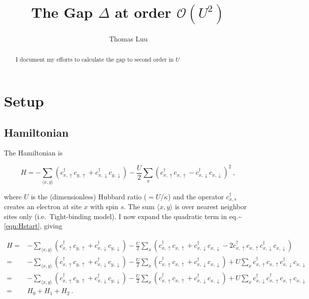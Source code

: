 \documentclass[
  letterpaper,
  DIV=11,
  numbers=noendperiod]{scrartcl}
\title{The Gap \(\Delta\) at order \(\mathcal{O}(U^2)\)}
\author{Thomas Luu}
\date{}
\begin{document}
\maketitle
\begin{abstract}
I document my efforts to calculate the gap to second order in \(U\)
\end{abstract}


\section{Setup}\label{setup}

\subsection{Hamiltonian}\label{hamiltonian}

The Hamiltonian is

\begin{equation}\label{eqn:Hstart}
H = -\sum_{\langle x,y\rangle}\left(c^\dagger_{x,\uparrow}c^{}_{y,\uparrow}+c^\dagger_{x,\downarrow}c^{}_{y,\downarrow}\right)-\frac{U}{2}\sum_x\left(c^\dagger_{x,\uparrow}c^{}_{x,\uparrow}-c^\dagger_{x,\downarrow}c^{}_{x,\downarrow}\right)^2\ ,
\end{equation}

where \(U\) is the (dimensionless) Hubbard ratio (\(=U/\kappa\)) and the
operator \(c^\dagger_{x,s}\) creates an electron at site \(x\) with spin
\(s\). The sum \({\langle x,y\rangle}\) is over nearest neighbor sites
only (i.e.~Tight-binding model). I now expand the quadratic term in
eq.\textasciitilde{}\eqref{eqn:Hstart}, giving

\begin{align}
H =&-\sum_{\langle x,y\rangle}\left(c^\dagger_{x,\uparrow}c^{}_{y,\uparrow}+c^\dagger_{x,\downarrow}c^{}_{y,\downarrow}\right)-\frac{U}{2}\sum_x\left(c^\dagger_{x,\uparrow}c^{}_{x,\uparrow}+c^\dagger_{x,\downarrow}c^{}_{x,\downarrow}-2c^\dagger_{x,\uparrow}c^{}_{x,\uparrow}c^\dagger_{x,\downarrow}c^{}_{x,\downarrow}\right)\\
=&-\sum_{\langle x,y\rangle}\left(c^\dagger_{x,\uparrow}c^{}_{y,\uparrow}+c^\dagger_{x,\downarrow}c^{}_{y,\downarrow}\right)-\frac{U}{2}\sum_x\left(c^\dagger_{x,\uparrow}c^{}_{x,\uparrow}+c^\dagger_{x,\downarrow}c^{}_{x,\downarrow}\right)+U\sum_xc^\dagger_{x,\uparrow}c^{}_{x,\uparrow}c^\dagger_{x,\downarrow}c^{}_{x,\downarrow}\\
=&-\sum_{\langle x,y\rangle}\left(c^\dagger_{x,\uparrow}c^{}_{y,\uparrow}+c^\dagger_{x,\downarrow}c^{}_{y,\downarrow}\right)-\frac{U}{2}\sum_x\left(c^\dagger_{x,\uparrow}c^{}_{x,\uparrow}+c^\dagger_{x,\downarrow}c^{}_{x,\downarrow}\right)+U\sum_xc^\dagger_{x,\downarrow}c^\dagger_{x,\uparrow}c^{}_{x,\uparrow}c^{}_{x,\downarrow}\\
=&H_0+H_1+H_2\ .
\end{align}
\end{document}
